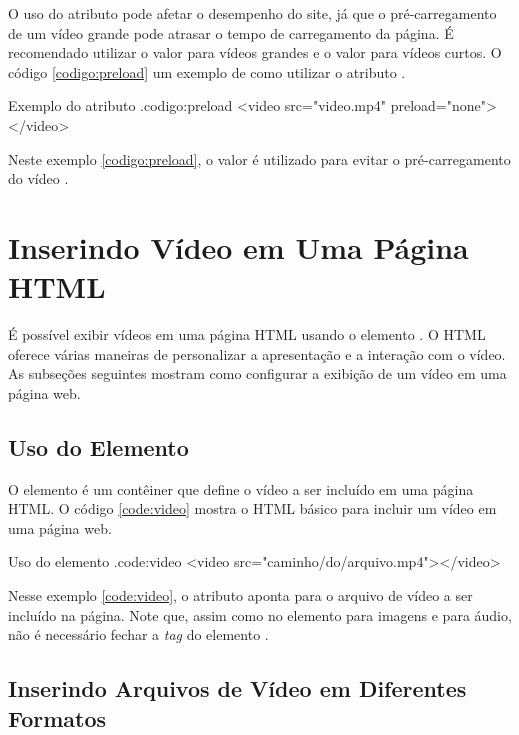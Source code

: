 O uso do atributo  pode afetar o desempenho do site, já que o pré-carregamento de um vídeo grande pode atrasar o tempo de carregamento da página. É recomendado utilizar o valor  para vídeos grandes e o valor  para vídeos curtos. O código \ref{codigo:preload} um exemplo de como utilizar o atributo .

\begin{htmlcode}{Exemplo do atributo .}{codigo:preload}
<video src="video.mp4" preload="none"></video>
\end{htmlcode}

Neste exemplo \ref{codigo:preload}, o valor  é utilizado para evitar o pré-carregamento do vídeo .

\section{Inserindo Vídeo em Uma Página HTML}

É possível exibir vídeos em uma página HTML usando o elemento . O HTML oferece várias maneiras de personalizar a apresentação e a interação com o vídeo. As subseções seguintes mostram como configurar a exibição de um vídeo em uma página web.

\subsection{Uso do Elemento }

O elemento  é um contêiner que define o vídeo a ser incluído em uma página HTML. O código \ref{code:video} mostra o HTML básico para incluir um vídeo em uma página web.

\begin{htmlcode}{Uso do elemento .}{code:video}
<video src="caminho/do/arquivo.mp4"></video>
\end{htmlcode}

Nesse exemplo \ref{code:video}, o atributo  aponta para o arquivo de vídeo a ser incluído na página. Note que, assim como no elemento  para imagens e  para áudio, não é necessário fechar a \textit{tag} do elemento .

\subsection{Inserindo Arquivos de Vídeo em Diferentes Formatos}


